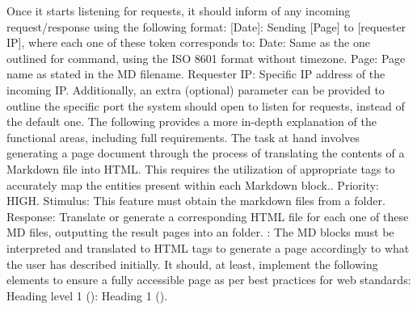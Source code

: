 {}Once it starts listening for requests, it should inform of any incoming request/response using the following format: [Date]: Sending [Page] to [requester IP], where each one of these token corresponds to:\markdownRendererInterblockSeparator
{}\markdownRendererUlBeginTight
\markdownRendererUlItem Date: Same as the one outlined for  command, using the ISO 8601 format without timezone.\markdownRendererUlItemEnd 
\markdownRendererUlItem Page: Page name as stated in the MD filename.\markdownRendererUlItemEnd 
\markdownRendererUlItem Requester IP: Specific IP address of the incoming IP.\markdownRendererUlItemEnd 
\markdownRendererUlEndTight \markdownRendererInterblockSeparator
{}Additionally, an extra (optional) parameter can be provided to outline the specific port the system should open to listen for requests, instead of the default one.\markdownRendererInterblockSeparator
{}\markdownRendererInterblockSeparator
{}The following provides a more in-depth explanation of the functional areas, including full requirements.\markdownRendererInterblockSeparator
{}\markdownRendererInterblockSeparator
{}\markdownRendererInterblockSeparator
{}The task at hand involves generating a page document through the process of translating the contents of a Markdown file into HTML. This requires the utilization of appropriate tags to accurately map the entities present within each Markdown block.. Priority: HIGH.\markdownRendererInterblockSeparator
{}\markdownRendererInterblockSeparator
{}Stimulus: This feature must obtain the markdown files from a  folder.\markdownRendererInterblockSeparator
{}Response: Translate or generate a corresponding HTML file for each one of these MD files, outputting the result pages into an  folder.\markdownRendererInterblockSeparator
{}\markdownRendererInterblockSeparator
{}: The MD blocks must be interpreted and translated to HTML tags to generate a page accordingly to what the user has described initially. It should, at least, implement the following elements to ensure a fully accessible page as per best practices for web standards:\markdownRendererInterblockSeparator
{}\markdownRendererUlBeginTight
\markdownRendererUlItem Heading level 1 (\markdownRendererCodeSpan{\markdownRendererHash{}}): Heading 1 ().\markdownRendererUlItemEnd 
